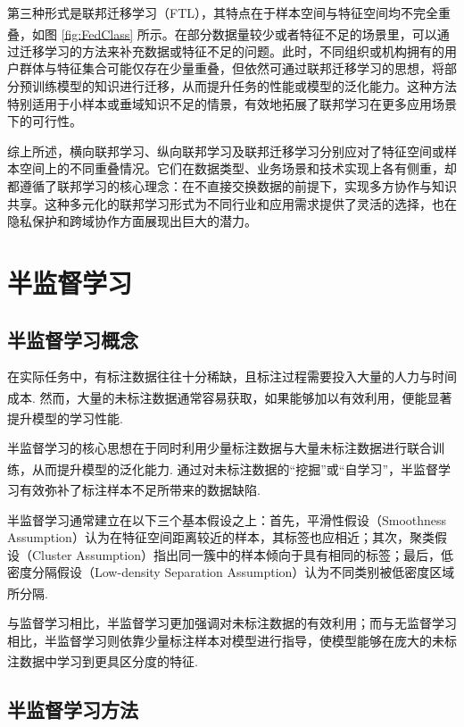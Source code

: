 第三种形式是联邦迁移学习（FTL），其特点在于样本空间与特征空间均不完全重叠\textsuperscript{\cite{yang2019federated,chen2020vafl}}，如图 \ref{fig:FedClass} 所示。在部分数据量较少或者特征不足的场景里，可以通过迁移学习的方法来补充数据或特征不足的问题。此时，不同组织或机构拥有的用户群体与特征集合可能仅存在少量重叠，但依然可通过联邦迁移学习的思想，将部分预训练模型的知识进行迁移，从而提升任务的性能或模型的泛化能力。这种方法特别适用于小样本或垂域知识不足的情景，有效地拓展了联邦学习在更多应用场景下的可行性。

综上所述，横向联邦学习、纵向联邦学习及联邦迁移学习分别应对了特征空间或样本空间上的不同重叠情况。它们在数据类型、业务场景和技术实现上各有侧重，却都遵循了联邦学习的核心理念：在不直接交换数据的前提下，实现多方协作与知识共享。这种多元化的联邦学习形式为不同行业和应用需求提供了灵活的选择，也在隐私保护和跨域协作方面展现出巨大的潜力。



\section{半监督学习}
\subsection{半监督学习概念}
在实际任务中，有标注数据往往十分稀缺，且标注过程需要投入大量的人力与时间成本\textsuperscript{\cite{chapelle2009semi}}. 然而，大量的未标注数据通常容易获取，如果能够加以有效利用，便能显著提升模型的学习性能\textsuperscript{\cite{zhu2005semi}}.

半监督学习的核心思想在于同时利用少量标注数据与大量未标注数据进行联合训练，从而提升模型的泛化能力\textsuperscript{\cite{van2020survey}}. 通过对未标注数据的“挖掘”或“自学习”，半监督学习有效弥补了标注样本不足所带来的数据缺陷\textsuperscript{\cite{chapelle2009semi}}.

半监督学习通常建立在以下三个基本假设之上：首先，平滑性假设（Smoothness Assumption）认为在特征空间距离较近的样本，其标签也应相近；其次，聚类假设（Cluster Assumption）指出同一簇中的样本倾向于具有相同的标签；最后，低密度分隔假设（Low-density Separation Assumption）认为不同类别被低密度区域所分隔\textsuperscript{\cite{zhu2005semi}}.

与监督学习相比，半监督学习更加强调对未标注数据的有效利用；而与无监督学习相比，半监督学习则依靠少量标注样本对模型进行指导，使模型能够在庞大的未标注数据中学习到更具区分度的特征\textsuperscript{\cite{van2020survey}}.
\subsection{半监督学习方法}

